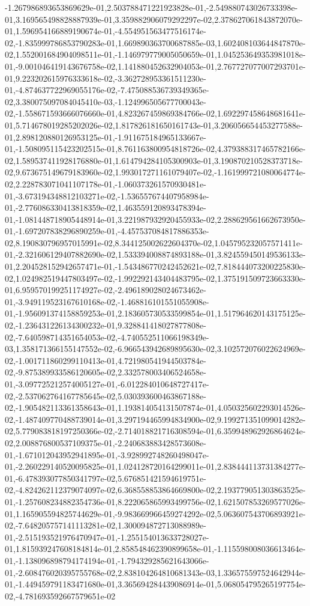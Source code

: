 -1.267986893653869629e-01,2.503788471221923828e-01,-2.549880743026733398e-01,3.169565498828887939e-01,3.359882906079292297e-02,2.378627061843872070e-01,1.596954166889190674e-01,-4.554951563477516174e-02,-1.835999786853790283e-01,1.669890363700687885e-03,1.602408103644847870e-02,1.552001684904098511e-01,-1.146979779005050659e-01,1.045253649353981018e-01,-9.001046419143676758e-02,1.141880452632904053e-01,2.767727077007293701e-01,9.223202615976333618e-02,-3.362728953361511230e-01,-4.874637722969055176e-02,-7.475088536739349365e-02,3.380075097084045410e-03,-1.124996505677700043e-02,-1.558671593666076660e-01,4.823267459869384766e-02,1.692297458648681641e-01,5.714678019285202026e-02,1.817826181650161743e-01,3.206056654453277588e-01,2.898120880126953125e-01,-1.911675184965133667e-01,-1.508095115423202515e-01,8.761163800954818726e-02,4.379388317465782166e-02,1.589537411928176880e-01,1.614794284105300903e-01,3.190870210528373718e-02,9.673675149679183960e-02,1.993017271161079407e-02,-1.161999721080064774e-02,2.228783071041107178e-01,-1.060373261570930481e-01,-3.673194348812103271e-02,-1.536557674407958984e-01,-2.776086330413818359e-02,1.463559120893478394e-01,-1.081448718905448914e-01,3.221987932920455933e-02,2.288629561662673950e-01,-1.697207838296890259e-01,-4.457537084817886353e-02,8.190830796957015991e-02,8.344125002622604370e-02,1.045795232057571411e-01,-2.321606129407882690e-02,1.533394008874893188e-01,3.824559450149536133e-01,2.204528152942657471e-01,-1.543486770242452621e-02,7.818444073200225830e-02,1.024982519447803497e-02,-1.992292143404483795e-02,1.375191509723663330e-01,6.959570199251174927e-02,-2.496189028024673462e-01,-3.949119523167610168e-02,-1.468816101551055908e-01,-1.956091374158859253e-01,2.183605730533599854e-01,1.517964620143175125e-02,-1.236431226134300232e-01,9.328841418027877808e-02,-7.640598714351654053e-02,-4.740552511066198349e-03,1.358171366155147552e-02,-6.966543942689895630e-02,3.102572076022624969e-02,-1.001711860299110413e-01,4.721980541944503784e-02,-9.875389933586120605e-02,2.332578003406524658e-01,-3.097725212574005127e-01,-6.012284010648727417e-02,-2.537062764167785645e-02,5.030393600463867188e-02,-1.905482113361358643e-01,1.193814054131507874e-01,4.050325602293014526e-02,-1.487409770488739014e-01,3.297194465994834900e-02,9.199271351099014282e-02,5.779083818197250366e-02,-2.714018821716308594e-01,6.359948962926864624e-02,2.008876800537109375e-01,-2.240683883428573608e-01,-1.671012043952941895e-01,-3.928992748260498047e-01,-2.260229140520095825e-01,1.024128720164299011e-01,2.838444113731384277e-01,-6.478393077850341797e-02,5.676851421594619751e-02,-4.824262112379074097e-02,6.368558853864669800e-02,2.193779051303863525e-01,-1.257608234882354736e-01,8.222065865993499756e-02,1.621507853269577026e-01,1.165905594825744629e-01,-9.983669966459274292e-02,5.063607543706893921e-02,-7.648205757141113281e-02,1.300094872713088989e-01,-2.515193521976470947e-01,-1.255154013633728027e-01,1.815939247608184814e-01,2.858548462390899658e-01,-1.115598008036613464e-01,-1.138096898794174194e-01,-1.794329285621643066e-01,-2.608476020395755768e-02,2.838104264810681343e-03,1.336575597524642944e-01,-1.449459791183471680e-01,3.365694284439086914e-01,5.068054795265197754e-02,-4.781693592667579651e-02

